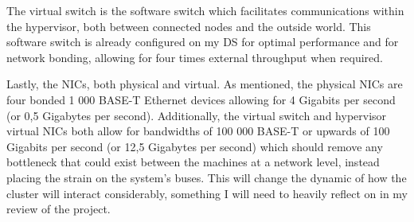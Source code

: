 The virtual switch is the software switch which facilitates communications within the hypervisor, both between connected nodes and the outside world. This software switch is already configured on my DS for optimal performance and for network bonding, allowing for four times external throughput when required.

Lastly, the NICs, both physical and virtual. As mentioned, the physical NICs are four bonded 1 000 BASE-T Ethernet devices allowing for 4 Gigabits per second (or 0,5 Gigabytes per second). Additionally, the virtual switch and hypervisor virtual NICs both allow for bandwidths of 100 000 BASE-T or upwards of 100 Gigabits per second (or 12,5 Gigabytes per second) which should remove any bottleneck that could exist between the machines at a network level, instead placing the strain on the system's buses. This will change the dynamic of how the cluster will interact considerably, something I will need to heavily reflect on in my review of the project.
